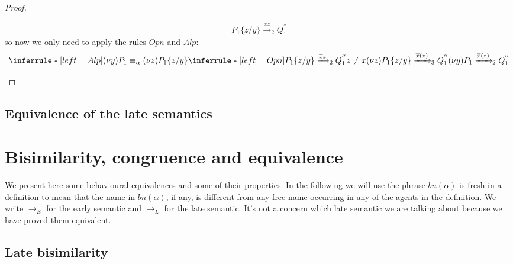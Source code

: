 \begin{theorem}
\begin{proof}
\begin{description}
\begin{description}
\begin{itemize}
\[			    P_{1}\{z/y\} 
			      \xrightarrow{\overline{x}z}_{2} 
				Q_{1}^{''} 
			\]
			so now we only need to apply the rules $Opn$ and $Alp$:
			\[
			  \inferrule* [left=Alp]{
			      (\nu y) P_{1}\equiv_{\alpha} (\nu z) P_{1}\{z/y\}
			    \\
			      \inferrule* [left=Opn]{
				  P_{1}\{z/y\} \xrightarrow{\overline{x}z}_{2} Q_{1}^{''}
				\\
				  z\neq x
			      }{
				(\nu z) P_{1}\{z/y\} \xrightarrow{\overline{x}(z)}_{3} Q_{1}^{''}
			      }
			  }{
			    (\nu y) P_{1} \xrightarrow{\overline{x}(z)}_{2} Q_{1}^{''}
			  }
			\]
		  \end{itemize}
		\end{description}
    \end{description}
  \end{proof}
\end{theorem}


\subsection{Equivalence of the late semantics}



\section{Bisimilarity, congruence and equivalence}

We present here some behavioural equivalences and some of their properties. In the following we will use the phrase $bn(\alpha)$ is fresh in a definition to mean that the name in $bn(\alpha)$, if any, is different from any free name occurring in any of the agents in the definition. We write $\rightarrow_{E}$ for the early semantic and $\rightarrow_{L}$ for the late semantic. It's not a concern which late semantic we are talking about because we have proved them equivalent.


\subsection{Late bisimilarity}

